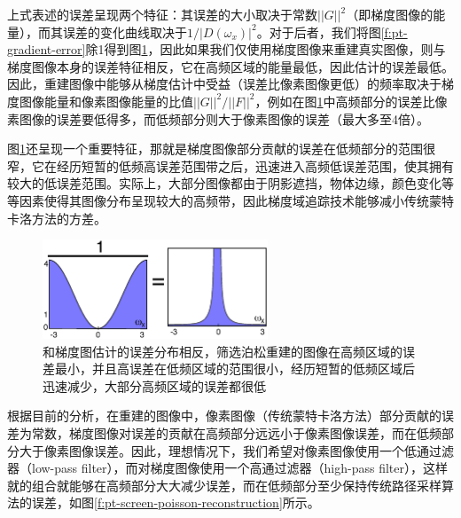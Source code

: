 上式表述的误差呈现两个特征：其误差的大小取决于常数$||G||^2$（即梯度图像的能量），而其误差的变化曲线取决于$1/|D(\omega_x)|^2$。对于后者，我们将图\ref{f:pt-gradient-error}除1得到图\ref{f:pt-reconstruction-error}，因此如果我们仅使用梯度图像来重建真实图像，则与梯度图像本身的误差特征相反，它在高频区域的能量最低，因此估计的误差最低。因此，重建图像中能够从梯度估计中受益（误差比像素图像更低）的频率取决于梯度图像能量和像素图像能量的比值$||G||^2/||F||^2$，例如在图\ref{f:pt-reconstruction-error}中高频部分的误差比像素图像的误差要低得多，而低频部分则大于像素图像的误差（最大多至4倍）。

图\ref{f:pt-reconstruction-error}还呈现一个重要特征，那就是梯度图像部分贡献的误差在低频部分的范围很窄，它在经历短暂的低频高误差范围带之后，迅速进入高频低误差范围，使其拥有较大的低误差范围。实际上，大部分图像都由于阴影遮挡，物体边缘，颜色变化等等因素使得其图像分布呈现较大的高频带，因此梯度域追踪技术能够减小传统蒙特卡洛方法的方差。

\begin{figure}
	\sidecaption
	\includegraphics[width=0.6\textwidth]{figures/pt/reconstruction-error}
	\caption{和梯度图估计的误差分布相反，筛选泊松重建的图像在高频区域的误差最小，并且高误差在低频区域的范围很小，经历短暂的低频区域后迅速减少，大部分高频区域的误差都很低}
	\label{f:pt-reconstruction-error}
\end{figure}

根据目前的分析，在重建的图像中，像素图像（传统蒙特卡洛方法）部分贡献的误差为常数，梯度图像对误差的贡献在高频部分远远小于像素图像误差，而在低频部分大于像素图像误差。因此，理想情况下，我们希望对像素图像使用一个低通过滤器（low-pass filter），而对梯度图像使用一个高通过滤器（high-pass filter），这样就的组合就能够在高频部分大大减少误差，而在低频部分至少保持传统路径采样算法的误差，如图\ref{f:pt-screen-poisson-reconstruction}所示。

